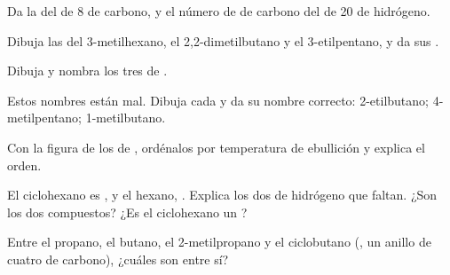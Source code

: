 \begin{exercise}[$\star$]\label{exo:g11:organic-skeletons:5}
Da la  del  de 8  de carbono, y el número
de  de carbono del  de 20  de hidrógeno.
\end{exercise}

\begin{exercise}[$\star\star$]\label{exo:g11:organic-skeletons:6}
Dibuja las  del 3-metilhexano, el
2,2-dimetilbutano y el 3-etilpentano, y da sus .
\end{exercise}

\begin{exercise}[$\star\star$]\label{exo:g11:organic-skeletons:7}
Dibuja y nombra los tres  de .
\end{exercise}

\begin{exercise}[$\star\star$]\label{exo:g11:organic-skeletons:8}
Estos nombres están mal. Dibuja cada  y da su nombre correcto:
2-etilbutano; 4-metilpentano; 1-metilbutano.
\end{exercise}

\begin{exercise}[$\star\star$]\label{exo:g11:organic-skeletons:9}
Con la figura de los  de , ordénalos por temperatura
de ebullición y explica el orden.
\end{exercise}

\begin{exercise}[$\star\star$]\label{exo:g11:organic-skeletons:10}
El ciclohexano es , y el hexano, . Explica los dos
 de hidrógeno que faltan. ¿Son  los dos compuestos? ¿Es el
ciclohexano un ?
\end{exercise}

\begin{exercise}[$\star\star$]\label{exo:g11:organic-skeletons:11}
Entre el propano, el butano, el 2-metilpropano y el ciclobutano
(, un anillo de cuatro  de carbono), ¿cuáles son 
entre sí?
\end{exercise}

